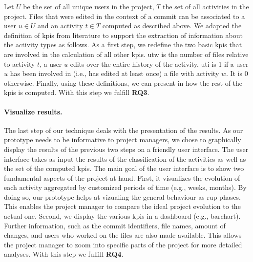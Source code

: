 Let $U$ be the set of all unique users in the project, $T$ the set of all activities in the project. Files that were edited in the context of a commit can be associated to a user $u \in U$ and an activity $t \in T$ computed as described above. 
We adapted the definition of \glspl{kpi} from literature to support the extraction of information about the activity types as follows. As a first step, we redefine the two basic \glspl{kpi} that are involved in the calculation of all other \glspl{kpi}. 
\gls{utw} is the number of files relative to activity $t$, a user $u$ edits over the entire history of the activity.
\gls{uti} is 1 if a user $u$ has been involved in (i.e., has edited at least once) a file with activity $w$. It is 0 otherwise. 
Finally, using these definitions, we can present in  how the rest of the \glspl{kpi} is computed. With this step we fulfill \textbf{RQ3}.\\\hfill



\paragraph{Visualize results.}
The last step of our technique deals with the presentation of the results. As our prototype needs to be informative to project managers, we chose to graphically display the results of the previous two steps on a friendly user interface. The user interface takes as input the results of the classification of the activities as well as the set of the computed \glspl{kpi}. 
The main goal of the user interface is to show two fundamental aspects of the project at hand. First, it visualizes the evolution of each activity aggregated by customized periods of time (e.g., weeks, months). By doing so, our prototype helps at vizualing the general behaviour as \gls{rup} phases. This enables the project manager to compare the ideal project evolution to the actual one. Second, we display the various \glspl{kpi} in a dashboard (e.g., barchart). Further information, such as the commit identifiers, file names, amount of changes, and users who worked on the files are also made available. This allows the project manager to zoom into specific parts of the project for more detailed analyses. With this step we fulfill \textbf{RQ4}.

